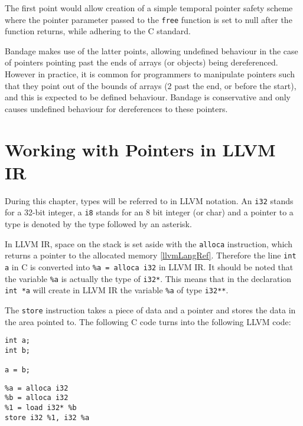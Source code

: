 The first point would allow creation of a simple temporal pointer safety scheme where the pointer parameter passed to the \verb!free! function is set to null after the function returns, while adhering to the C standard.

Bandage makes use of the latter points, allowing undefined behaviour in the case of pointers pointing past the ends of arrays (or objects) being dereferenced.
However in practice, it is common for programmers to manipulate pointers such that they point out of the bounds of arrays (2 past the end, or before the start), and this is expected to be defined behaviour.
Bandage is conservative and only causes undefined behaviour for dereferences to these pointers.

\section{Working with Pointers in LLVM IR}

During this chapter, types will be referred to in LLVM notation.
An \verb!i32! stands for a 32-bit integer, a \verb!i8! stands for an 8 bit integer (or char) and a pointer to a type is denoted by the type followed by an asterisk.

In LLVM IR, space on the stack is set aside with the \verb!alloca! instruction, which returns a pointer to the allocated memory \ref{llvmLangRef}.
Therefore the line \verb!int a! in C is converted into \verb!%a = alloca i32! in LLVM IR.
It should be noted that the variable \verb!%a! is actually the type of \verb!i32*!.
This means that in the declaration \verb!int *a! will create in LLVM IR the variable \verb!%a! of type \verb!i32**!.

The \verb!store! instruction takes a piece of data and a pointer and stores the data in the area pointed to.
The following C code turns into the following LLVM code:

\begin{minipage}[t]{0.5\linewidth}
\begin{verbatim}
int a;
int b;

a = b;
\end{verbatim}
\end{minipage}
\begin{minipage}[t]{0.5\linewidth}
\begin{verbatim}
%a = alloca i32
%b = alloca i32
%1 = load i32* %b
store i32 %1, i32 %a
\end{verbatim}
\end{minipage}

